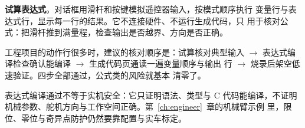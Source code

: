 \textbf{试算表达式}。对话框用滑杆和按键模拟遥控器输入，按模式顺序执行
变量行与表达式行，显示每一行的结果。它不连接硬件、不运行生成代码，只
用于核对公式：把滑杆推到满量程，检查输出是否越界、方向是否正确。

工程项目的动作行很多时，建议的核对顺序是：试算核对典型输入 $\rightarrow$
表达式编译检查确认能编译 $\rightarrow$ 生成代码页通读一遍变量顺序与输出
行 $\rightarrow$ 烧录后架空低速验证。四步全部通过，公式类的风险就基本
清零了。

\begin{remark}
表达式编译通过不等于实机安全：它只证明语法、类型与 C 代码能编译，不证明
机械参数、舵机方向与工作空间正确。第~\ref{ch:engineer}~章的机械臂示例
里，限位、零位与奇异点防护仍然要靠配置与实车标定。
\end{remark}
